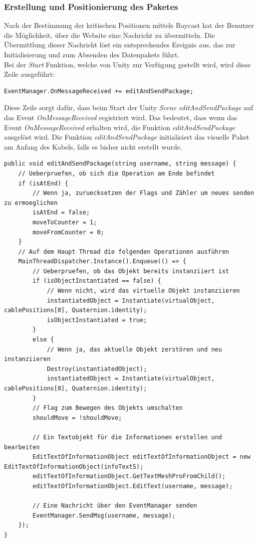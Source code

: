 \subsubsection{Erstellung und Positionierung des Paketes}\label{sec:PaketPos}
Nach der Bestimmung der kritischen Positionen mittels Raycast hat der Benutzer die Möglichkeit, über die Website eine Nachricht zu übermitteln. Die Übermittlung dieser Nachricht löst ein entsprechendes Ereignis aus, das zur Initialisierung und zum Absenden des Datenpakets führt.\\
Bei der \textit{Start} Funktion, welche von Unity zur Verfügung gestellt  wird, wird diese Zeile ausgeführt:
\begin{lstlisting}[style=csharp, caption={Binden an der Methode}, label=code:]
EventManager.OnMessageReceived += editAndSendPackage;
\end{lstlisting}
Diese Zeile sorgt dafür, dass beim Start der Unity \textit{Scene} \textit{editAndSendPackage} auf das Event \textit{OnMessageReceived} registriert wird. Das bedeutet, dass wenn das Event \textit{OnMessageReceived} erhalten wird, die Funktion \textit{editAndSendPackage} ausgelöst wird.
Die Funktion \textit{editAndSendPackage} initialisiert das visuelle Paket am Anfang des Kabels, falls es bisher nicht erstellt wurde.
\begin{lstlisting}[style=csharp, caption={Initialisierung und Bearbeitung des Paketes}, label=code:editAndSendPackage]
public void editAndSendPackage(string username, string message) {
    // Ueberpruefen, ob sich die Operation am Ende befindet
    if (isAtEnd) {
        // Wenn ja, zuruecksetzen der Flags und Zähler um neues senden zu ermoeglichen
        isAtEnd = false;
        moveToCounter = 1;
        moveFromCounter = 0;
    }
    // Auf dem Haupt Thread die folgenden Operationen ausführen
    MainThreadDispatcher.Instance().Enqueue(() => {
        // Ueberpruefen, ob das Objekt bereits instanziiert ist
        if (isObjectInstantiated == false) {
            // Wenn nicht, wird das virtuelle Objekt instanziieren
            instantiatedObject = Instantiate(virtualObject, cablePositions[0], Quaternion.identity);
            isObjectInstantiated = true;
        }
        else {
            // Wenn ja, das aktuelle Objekt zerstören und neu instanziieren
            Destroy(instantiatedObject);
            instantiatedObject = Instantiate(virtualObject, cablePositions[0], Quaternion.identity);
        }
        // Flag zum Bewegen des Objekts umschalten
        shouldMove = !shouldMove;

        // Ein Textobjekt für die Informationen erstellen und bearbeiten
        EditTextOfInformationObject editTextOfInformationObject = new EditTextOfInformationObject(infoTextS);
        editTextOfInformationObject.GetTextMeshProFromChild();
        editTextOfInformationObject.EditText(username, message);

        // Eine Nachricht über den EventManager senden
        EventManager.SendMsg(username, message);
    });
}
\end{lstlisting}
